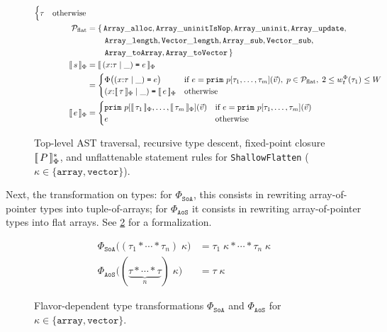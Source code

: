 \begin{figure}[htbp]
\[\begin{aligned}
\begin{cases}
           \tau & \text{otherwise}
         \end{cases} \\
    \mathcal{P}_{\text{flat}}
      &= \{\, \mathtt{Array\_alloc}, \mathtt{Array\_uninitIsNop}, \mathtt{Array\_uninit}, \mathtt{Array\_update}, \\
      &\phantom{{}= \{\,\,} \mathtt{Array\_length}, \mathtt{Vector\_length}, \mathtt{Array\_sub}, \mathtt{Vector\_sub}, \\
      &\phantom{{}= \{\,\,} \mathtt{Array\_toArray}, \mathtt{Array\_toVector} \,\} \\
    \sembrack{s}_\Phi
      &= \sembrack{(x{:}\tau \mid \mathtt{\_}) \syneq e}_\Phi \\
      &= \begin{cases}
           \Phi\big((x{:}\tau \mid \mathtt{\_}) \syneq e\big)
             & \text{if } e = \mathtt{prim}\ p[\tau_1, \dots, \tau_m](\vec{v}),\; p \in \mathcal{P}_{\text{flat}},\; 2 \le w_t^\Phi(\tau_1) \le W \\
           (x{:}\sembrack{\tau}_\Phi \mid \mathtt{\_}) \syneq \sembrack{e}_\Phi
             & \text{otherwise}
         \end{cases} \\
    \sembrack{e}_\Phi
      &= \begin{cases}
           \mathtt{prim}\ p[\sembrack{\tau_1}_\Phi, \dots, \sembrack{\tau_m}_\Phi](\vec{v})
             & \text{if } e = \mathtt{prim}\ p[\tau_1, \dots, \tau_m](\vec{v}) \\
           e & \text{otherwise}
         \end{cases}
  \end{aligned}
  \]
  \caption{Top-level AST traversal, recursive type descent, fixed-point closure $[\![\, P \,]\!]_\Phi^*$, and unflattenable statement rules for \texttt{ShallowFlatten} ($\kappa \in \{\mathtt{array}, \mathtt{vector}\}$).}
  \label{fig:shallow_flat_toplevel}
\end{figure}

Next, the transformation on types: for $\Phi_{\texttt{SoA}}$, this consists in
rewriting array-of-pointer types into tuple-of-arrays; for $\Phi_{\texttt{AoS}}$
it consists in rewriting array-of-pointer types into flat arrays.
See \cref{fig:shallow_flat_types} for a formalization.

\begin{figure}[htbp]
  \centering
  \footnotesize
  \setlength{\abovedisplayskip}{2pt}
  \setlength{\belowdisplayskip}{2pt}
  \setlength{\jot}{2pt}
  \[
  \begin{aligned}
    \Phi_{\texttt{SoA}}\big((\tau_1 * \cdots * \tau_n)\;\kappa\big)
      &= \tau_1\;\kappa * \cdots * \tau_n\;\kappa \\
    \Phi_{\texttt{AoS}}\big((\underbrace{\tau * \cdots * \tau}_{n})\;\kappa\big)
      &= \tau\;\kappa
  \end{aligned}
  \]
  \caption{Flavor-dependent type transformations $\Phi_{\texttt{SoA}}$ and $\Phi_{\texttt{AoS}}$ for $\kappa \in \{\mathtt{array}, \mathtt{vector}\}$.}
  \label{fig:shallow_flat_types}
\end{figure}

